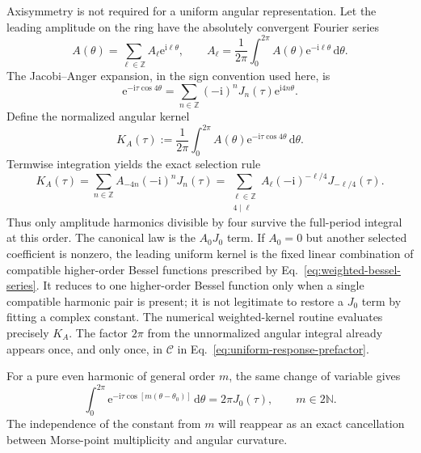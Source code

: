 Axisymmetry is not required for a uniform angular representation.  Let the
leading amplitude on the ring have the absolutely convergent Fourier series
\begin{equation}
  A(\theta)=\sum_{\ell\in\mathbb Z}A_\ell\mathrm e^{\mathrm i\ell\theta},
  \qquad
  A_\ell=\frac{1}{2\pi}\int_0^{2\pi}
    A(\theta)\mathrm e^{-\mathrm i\ell\theta}\,\mathrm d\theta.
  \label{eq:angular-amplitude-fourier-series}
\end{equation}
The Jacobi--Anger expansion, in the sign convention used here, is
\begin{equation}
  \mathrm e^{-\mathrm i\tau\cos4\theta}
  =\sum_{n\in\mathbb Z}(-\mathrm i)^nJ_n(\tau)
    \mathrm e^{\mathrm i4n\theta}.
  \label{eq:fourfold-jacobi-anger}
\end{equation}
Define the normalized angular kernel
\begin{equation}
  K_A(\tau):=\frac{1}{2\pi}\int_0^{2\pi}A(\theta)
    \mathrm e^{-\mathrm i\tau\cos4\theta}\,\mathrm d\theta.
  \label{eq:normalized-weighted-bessel-kernel}
\end{equation}
Termwise integration yields the exact selection rule
\begin{equation}
  K_A(\tau)
  =\sum_{n\in\mathbb Z}
    A_{-4n}(-\mathrm i)^nJ_n(\tau)
  =\sum_{\substack{\ell\in\mathbb Z\\4\mid\ell}}
    A_\ell(-\mathrm i)^{-\ell/4}J_{-\ell/4}(\tau).
  \label{eq:weighted-bessel-series}
\end{equation}
Thus only amplitude harmonics divisible by four survive the full-period
integral at this order.  The canonical law is the \(A_0J_0\) term.  If
\(A_0=0\) but another selected coefficient is nonzero, the leading uniform
kernel is the fixed linear combination of compatible higher-order Bessel
functions prescribed by Eq.~\eqref{eq:weighted-bessel-series}.  It reduces
to one higher-order Bessel function only when a single compatible harmonic
pair is present; it is not legitimate to restore a \(J_0\) term by fitting a
complex constant.
The numerical weighted-kernel routine evaluates precisely \(K_A\).  The
factor \(2\pi\) from the unnormalized angular integral already appears once,
and only once, in \(\mathcal C\) in
Eq.~\eqref{eq:uniform-response-prefactor}.

For a pure even harmonic of general order \(m\), the same change of variable
gives
\begin{equation}
  \int_0^{2\pi}\mathrm e^{-\mathrm i\tau\cos[m(\theta-\theta_0)]}
    \,\mathrm d\theta=2\pi J_0(\tau),
  \qquad m\in2\mathbb N.
  \label{eq:general-harmonic-bessel-identity}
\end{equation}
The independence of the constant from \(m\) will reappear as an exact
cancellation between Morse-point multiplicity and angular curvature.


